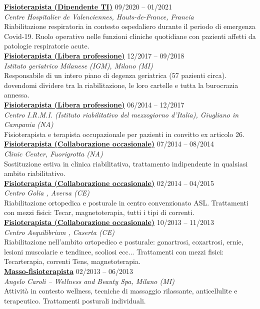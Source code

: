 \documentclass[a4paper]{article}
\newcommand{\voice}[5]{\href{#4}{\textbf{#1}} \hfill #2 \\ \textit{#3} \\ {\small #5} \vspace{0.2cm} \\}
\begin{document}
\begin{minipage}[t]{0.6\columnwidth}
    \voice{Fisioterapista (Dipendente TI)}
    {09/2020 -- 01/2021}
    {Centre Hospitalier de Valenciennes, Hauts-de-France, Francia}
    {https://www.ch-valenciennes.fr/}
    {
    Riabilitazione respiratoria in contesto ospedaliero durante il periodo di emergenza Covid-19. Ruolo operativo nelle funzioni cliniche quotidiane con pazienti affetti da patologie respiratorie acute.%
    }
    \voice{Fisioterapista (Libera professione)}
    {12/2017 -- 09/2018}
    {Istituto geriatrico Milanese (IGM), Milano (MI)}
    {https://www.igm-care.it/service/istituto-geriatrico-milanese/}
    {Responsabile di un intero piano di degenza geriatrica (57 pazienti circa). dovendomi dividere tra la riabilitazione, le loro cartelle e tutta la burocrazia annessa.}
    \voice{Fisioterapista (Libera professione)}
    {06/2014 -- 12/2017}
    {Centro I.R.M.I. (Istituto riabilitativo del mezzogiorno d'Italia), Giugliano in Campania (NA)}
    {https://www.aiopcampania.it/mostrascheda.asp?id=1425}
    {Fisioterapista e terapista occupazionale per pazienti in convitto ex articolo 26.}
    \voice{Fisioterapista (Collaborazione occasionale)}
    {07/2014 -- 08/2014}
    {Clinic Center, Fuorigrotta (NA)}
    {https://cliniccenter.eu/}
    {Sostituzione estiva in clinica riabilitativa, trattamento indipendente in qualsiasi ambito riabilitativo.
    }
    \voice{Fisioterapista (Collaborazione occasionale)}
    {02/2014 -- 04/2015}
    {Centro Golia , Aversa (CE)}
    {https://centrogolia.com/}
    {
        Riabilitazione ortopedica e posturale in centro convenzionato ASL.
        Trattamenti con mezzi fisici: Tecar, magnetoterapia, tutti i tipi di correnti.}
    \voice{Fisioterapista (Collaborazione occasionale)}
    {10/2013 -- 11/2013}
    {Centro Aequilibrium , Caserta (CE)}
    {https://www.fisioterapistacaserta.it/About}
    {Riabilitazione nell'ambito ortopedico e posturale:  gonartrosi, coxartrosi, ernie, lesioni muscolarie  e tendinee, scoliosi ecc...
    Trattamenti con mezzi fisici: Tecarterapia, correnti Tens, magnetoterapia.}
%
    \voice{Masso-fisioterapista}
    {02/2013 -- 06/2013}
    {Angelo Caroli – Wellness and Beauty Spa, Milano (MI)}
    {https://www.angelocaroli.com/}
    {
    Attività in contesto wellness, tecniche di massaggio rilassante, anticellulite e terapeutico.
    Trattamenti posturali individuali.
    }




















\end{minipage} 
\end{document}
